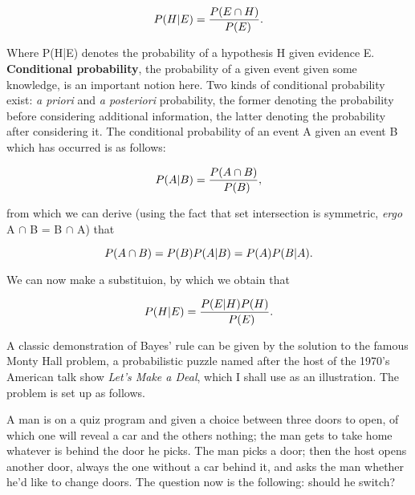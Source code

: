 \begin{equation}
  \\P(H|E)=\frac{\\P(E \cap H)}{\\P(E)}.
\end{equation}

Where P(H|E) denotes the probability of a hypothesis H given evidence E.
\textbf{Conditional probability}, the probability of a given event given some
knowledge, is an important notion here. Two kinds of conditional probability
exist: \textit{a priori} and \textit{a posteriori} probability, the former
denoting the probability before considering additional information, the latter
denoting the probability after considering it. The conditional probability of
an event A given an event B which has occurred is as follows:

\begin{equation}
\\P(A|B) = \frac{\\P(A \cap B)}{\\P(B)},
\end{equation}

from which we can derive (using the fact that set intersection is symmetric,
\textit{ergo} A $\cap$ B = B $\cap$ A) that

\begin{equation}
\\P(A \cap B) = \\P(B)\\P(A|B) = \\P(A)\\P(B|A).
\end{equation}

We can now make a substituion, by which we obtain that

\begin{equation}
\\P(H|E) = \frac{\\P(E|H)\\P(H)}{\\P(E)}.
\end{equation}

A classic demonstration of Bayes' rule can be given by the solution to the
famous Monty Hall problem, a probabilistic puzzle named after the host of the
1970's American talk show \textit{Let's Make a Deal}, which I shall use as an
illustration. The problem is set up as follows.

A man is on a quiz program and given a choice between three doors to open, of
which one will reveal a car and the others nothing; the man gets to take home
whatever is behind the door he picks. The man picks a door; then the host opens
another door, always the one without a car behind it, and asks the man whether
he'd like to change doors. The question now is the following: should he switch?

